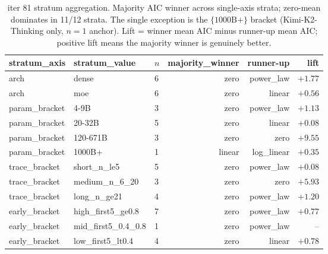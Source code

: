 \begin{table}[h]
\centering
\small
\caption{iter 81 stratum aggregation.  Majority AIC winner across
single-axis strata; zero-mean dominates in 11/12 strata.  The single
exception is the $\{1000\mathrm{B}+\}$ bracket (Kimi-K2-Thinking only,
$n=1$ anchor).  Lift = winner mean AIC minus runner-up mean AIC;
positive lift means the majority winner is genuinely better.}
\label{tab:iter81-strat-lift}
\begin{tabular}{lllrrr}
\hline
stratum\_axis & stratum\_value & $n$ & majority\_winner & runner-up & lift \\
\hline
arch & dense & 6 & zero & power\_law & $+1.77$ \\
arch & moe & 6 & zero & linear & $+0.56$ \\
param\_bracket & 4-9B & 3 & zero & power\_law & $+1.13$ \\
param\_bracket & 20-32B & 5 & zero & linear & $+0.08$ \\
param\_bracket & 120-671B & 3 & zero & zero & $+9.55$ \\
param\_bracket & 1000B+ & 1 & linear & log\_linear & $+0.35$ \\
trace\_bracket & short\_n\_le5 & 5 & zero & power\_law & $+0.08$ \\
trace\_bracket & medium\_n\_6\_20 & 3 & zero & zero & $+5.93$ \\
trace\_bracket & long\_n\_ge21 & 4 & zero & power\_law & $+1.20$ \\
early\_bracket & high\_first5\_ge0.8 & 7 & zero & power\_law & $+0.77$ \\
early\_bracket & mid\_first5\_0.4\_0.8 & 1 & zero & power\_law & -- \\
early\_bracket & low\_first5\_lt0.4 & 4 & zero & linear & $+0.78$ \\
\hline
\end{tabular}
\end{table}

